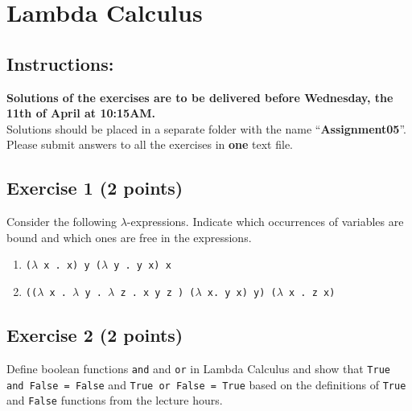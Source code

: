\documentclass [11pt, a4wide, twoside]{article}
\begin{document}
\section*{ Lambda Calculus}


\subsection*{Instructions:}

\textbf{Solutions of the exercises are to be delivered before Wednesday, the 11th of April at 10:15AM.}\\
Solutions should be placed in a separate folder with the name ``\textbf{Assignment05}''.\\
Please submit answers to all the exercises in \textbf{one} text file.\\

\subsection*{Exercise 1 (2 points)}

Consider the following $\lambda$-expressions. Indicate which occurrences of
variables are bound and which ones are free in the expressions.
\begin{enumerate}
\item \texttt{($\lambda$ x .~x) y ($\lambda$ y .~y x) x}

\item \texttt{(($\lambda$ x .~$\lambda$ y .~$\lambda$ z .~x y z ) ($\lambda$ x. y x) y) ($\lambda$ x .~z x)}

\end{enumerate}


%
\subsection*{Exercise 2 (2 points)}

Define boolean functions \verb!and! and \verb!or! in Lambda Calculus and show that \texttt{True and False  = False} and \texttt{True or False = True} based on the definitions of \texttt{True} and \texttt{False} functions from the lecture hours.
\end{document}

